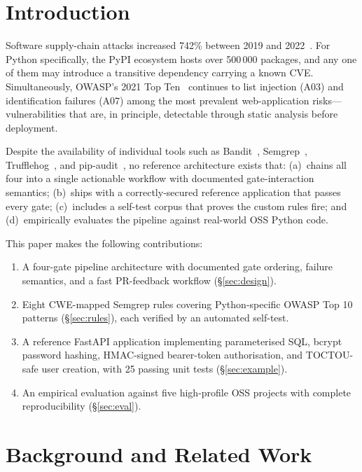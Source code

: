 \documentclass[conference]{IEEEtran}
\begin{document}
\section{Introduction}

Software supply-chain attacks increased 742\% between 2019 and 2022~\cite{sonatype2022}.
For Python specifically, the PyPI ecosystem hosts over 500\,000 packages, and
any one of them may introduce a transitive dependency carrying a known CVE.
Simultaneously, OWASP's 2021 Top Ten~\cite{owasp2021} continues to list
injection (A03) and identification failures (A07) among the most prevalent
web-application risks---vulnerabilities that are, in principle, detectable
through static analysis before deployment.

Despite the availability of individual tools such as Bandit~\cite{bandit},
Semgrep~\cite{semgrep}, Trufflehog~\cite{trufflehog}, and pip-audit~\cite{pipaudit},
no reference architecture exists that: (a)~chains all four into a single
actionable workflow with documented gate-interaction semantics; (b)~ships
with a correctly-secured reference application that passes every gate;
(c)~includes a self-test corpus that proves the custom rules fire; and
(d)~empirically evaluates the pipeline against real-world OSS Python code.

This paper makes the following contributions:

\begin{enumerate}
  \item A four-gate pipeline architecture with documented gate ordering,
        failure semantics, and a fast PR-feedback workflow (\S\ref{sec:design}).
  \item Eight CWE-mapped Semgrep rules covering Python-specific OWASP Top 10
        patterns (\S\ref{sec:rules}), each verified by an automated self-test.
  \item A reference FastAPI application implementing parameterised SQL,
        bcrypt password hashing, HMAC-signed bearer-token authorisation, and
        TOCTOU-safe user creation, with 25 passing unit tests (\S\ref{sec:example}).
  \item An empirical evaluation against five high-profile OSS projects with
        complete reproducibility (\S\ref{sec:eval}).
\end{enumerate}

\section{Background and Related Work}
\label{sec:background}
\end{document}
